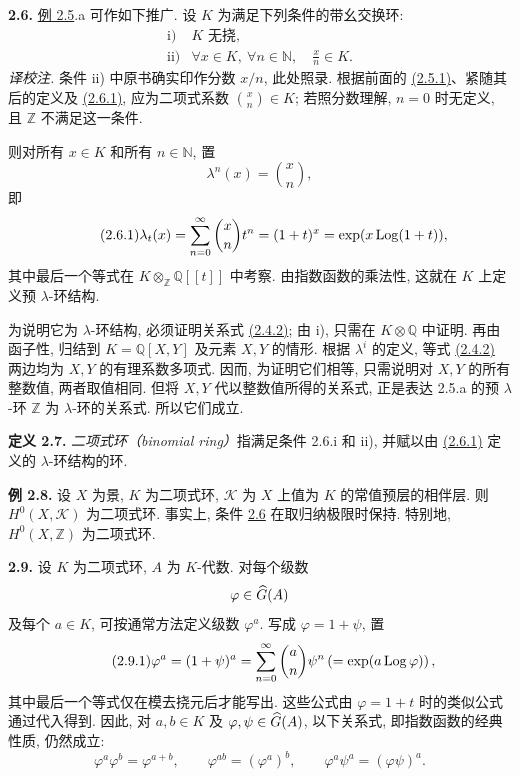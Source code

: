 \textbf{2.6.} \hyperlink{sga6.e05.ex.2-5}{例 2.5}.a 可作如下推广. 设 \(K\) 为满足下列条件的带幺交换环:
\[
\begin{array}{ll}
\text{i)}& K\text{ 无挠},\\
\text{ii)}& \forall x\in K,\ \forall n\in\mathbb N,\quad \frac{x}{n}\in K .
\end{array}
\]
\emph{译校注.} 条件 ii) 中原书确实印作分数 \(x/n\), 此处照录. 根据前面的 \hyperlink{sga6.e05.eq.2-5-1}{(2.5.1)}、紧随其后的定义及 \hyperlink{sga6.e05.eq.2-6-1}{(2.6.1)}, 应为二项式系数 \(\binom{x}{n}\in K\); 若照分数理解, \(n=0\) 时无定义, 且 \(\mathbb Z\) 不满足这一条件.

则对所有 \(x\in K\) 和所有 \(n\in\mathbb N\), 置
\[
  \lambda^n(x)=\binom{x}{n},
\]
即
\begin{equation}\tag{2.6.1}
  \lambda_t(x)=\sum_{n=0}^{\infty}\binom{x}{n}t^n
  =(1+t)^x=\exp(x\operatorname{Log}(1+t)),
\end{equation}
其中最后一个等式在 \(K\otimes_{\mathbb Z}\mathbb Q[[t]]\) 中考察. 由指数函数的乘法性, 这就在 \(K\) 上定义预 \(\lambda\)-环结构.

为说明它为 \(\lambda\)-环结构, 必须证明关系式 \hyperlink{sga6.e05.eq.2-4-2}{(2.4.2)}; 由 i), 只需在 \(K\otimes\mathbb Q\) 中证明. 再由函子性, 归结到 \(K=\mathbb Q[X,Y]\) 及元素 \(X,Y\) 的情形. 根据 \(\lambda^i\) 的定义, 等式 \hyperlink{sga6.e05.eq.2-4-2}{(2.4.2)} 两边均为 \(X,Y\) 的有理系数多项式. 因而, 为证明它们相等, 只需说明对 \(X,Y\) 的所有整数值, 两者取值相同. 但将 \(X,Y\) 代以整数值所得的关系式, 正是表达 2.5.a 的预 \(\lambda\)-环 \(\mathbb Z\) 为 \(\lambda\)-环的关系式. 所以它们成立.

\textbf{定义 2.7.} \emph{二项式环（binomial ring）}指满足条件 2.6.i 和 ii), 并赋以由 \hyperlink{sga6.e05.eq.2-6-1}{(2.6.1)} 定义的 \(\lambda\)-环结构的环.

\textbf{例 2.8.} 设 \(X\) 为景, \(K\) 为二项式环, \(\mathcal K\) 为 \(X\) 上值为 \(K\) 的常值预层的相伴层. 则 \(H^0(X,\mathcal K)\) 为二项式环. 事实上, 条件 \hyperlink{sga6.e05.para.2-6}{2.6} 在取归纳极限时保持. 特别地, \(H^0(X,\mathbb Z)\) 为二项式环.

\textbf{2.9.} 设 \(K\) 为二项式环, \(A\) 为 \(K\)-代数. 对每个级数
\[
  \varphi\in\widehat G(A)
\]
及每个 \(a\in K\), 可按通常方法定义级数 \(\varphi^a\). 写成 \(\varphi=1+\psi\), 置
\begin{equation}\tag{2.9.1}
  \varphi^a=(1+\psi)^a
  =
  \sum_{n=0}^{\infty}\binom{a}{n}\psi^n
  \left(=\exp(a\operatorname{Log}\varphi)\right),
\end{equation}
其中最后一个等式仅在模去挠元后才能写出. 这些公式由 \(\varphi=1+t\) 时的类似公式通过代入得到. 因此, 对 \(a,b\in K\) 及 \(\varphi,\psi\in\widehat G(A)\), 以下关系式, 即指数函数的经典性质, 仍然成立:
\begin{equation}\tag{2.9.2}
  \varphi^a\varphi^b=\varphi^{a+b},\qquad
  \varphi^{ab}=(\varphi^a)^b,\qquad
  \varphi^a\psi^a=(\varphi\psi)^a .
\end{equation}



